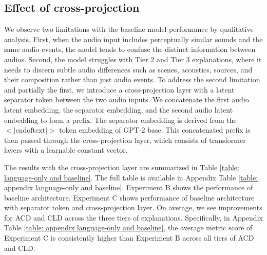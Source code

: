 \vspace{-0.1in}
\subsection{Effect of cross-projection} \label{subsec: effect of cross-projection} \vspace{-0.1in}
We observe two limitations with the baseline model performance by qualitative analysis. First, when the audio input includes perceptually similar sounds and the same audio events, the model tends to confuse the distinct information between audios. Second, the model struggles with Tier 2 and Tier 3 explanations, where it needs to discern subtle audio differences such as scenes, acoustics, sources, and their composition rather than just audio events. To address the second limitation and partially the first, we introduce a cross-projection layer with a latent separator token between the two audio inputs. We concatenate the first audio latent embedding, the separator embedding, and the second audio latent embedding to form a prefix. The separator embedding is derived from the $<|\text{endoftext}|>$ token embedding of GPT-2 base. This concatenated prefix is then passed through the cross-projection layer, which consists of transformer layers with a learnable constant vector.

The results with the cross-projection layer are summarized in Table \ref{table: language-only and baseline}. The full table is available in Appendix Table \ref{table: appendix language-only and baseline}. Experiment B shows the performance of baseline architecture. Experiment C shows performance of baseline architecture with separator token and cross-projection layer. On average, we see improvements for ACD and CLD across the three tiers of explanations. Specifically, in Appendix Table \ref{table: appendix language-only and baseline}, the average metric score of Experiment C is consistently higher than Experiment B across all tiers of ACD and CLD. 

